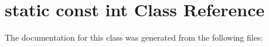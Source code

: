 \hypertarget{classstatic_01const_01int}{}\section{static const int Class Reference}
\label{classstatic_01const_01int}


The documentation for this class was generated from the following files\+: